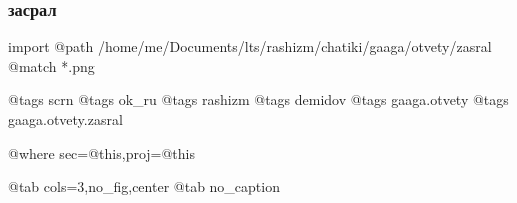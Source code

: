  
 
 
 
 

\subsubsection{засрал}

\ifcmt
  import
    @path /home/me/Documents/lts/rashizm/chatiki/gaaga/otvety/zasral
    @match *.png

    @tags scrn
    @tags ok_ru
    @tags rashizm
    @tags demidov
    @tags gaaga.otvety
    @tags gaaga.otvety.zasral

    @where sec=@this,proj=@this
  
    @tab cols=3,no_fig,center
    @tab no_caption
\fi
